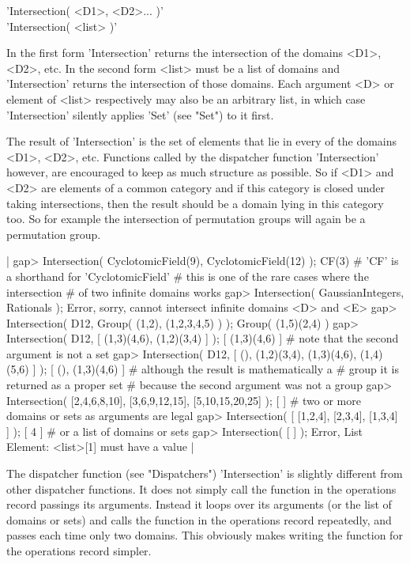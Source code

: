 %

'Intersection( <D1>, <D2>... )' \\
'Intersection( <list> )'

In the first form 'Intersection' returns the  intersection of the domains
<D1>, <D2>, etc.  In the second form <list> must be a list of domains and
'Intersection' returns the intersection  of those domains.  Each argument
<D> or  element of <list> respectively may  also be an arbitrary list, in
which case 'Intersection' silently applies 'Set' (see "Set") to it first.

The result of 'Intersection' is the set of elements  that lie in every of
the domains <D1>, <D2>, etc.  Functions called by the dispatcher function
'Intersection'  however,  are  encouraged to  keep  as  much structure as
possible.  So if <D1> and  <D2> are elements  of a common category and if
this   category is  closed  under taking  intersections,  then the result
should be a   domain lying  in  this category  too.  So  for  example the
intersection of permutation groups will again be a permutation group.

|    gap> Intersection( CyclotomicField(9), CyclotomicField(12) );
    CF(3)    # 'CF' is a shorthand for 'CyclotomicField'
             # this is one of the rare cases where the intersection
             # of two infinite domains works
    gap> Intersection( GaussianIntegers, Rationals );
    Error, sorry, cannot intersect infinite domains <D> and <E>
    gap> Intersection( D12, Group( (1,2), (1,2,3,4,5) ) );
    Group( (1,5)(2,4) )
    gap> Intersection( D12, [ (1,3)(4,6), (1,2)(3,4) ] );
    [ (1,3)(4,6) ]    # note that the second argument is not a set
    gap> Intersection( D12, [ (), (1,2)(3,4), (1,3)(4,6), (1,4)(5,6) ] );
    [ (), (1,3)(4,6) ]    # although the result is mathematically a
                          # group it is returned as a proper set
                          # because the second argument was not a group
    gap> Intersection( [2,4,6,8,10], [3,6,9,12,15], [5,10,15,20,25] );
    [  ]    # two or more domains or sets as arguments are legal
    gap> Intersection( [ [1,2,4], [2,3,4], [1,3,4] ] );
    [ 4 ]    # or a list of domains or sets
    gap> Intersection( [ ] );
    Error, List Element: <list>[1] must have a value |

The  dispatcher function  (see "Dispatchers") 'Intersection' is  slightly
different from other  dispatcher functions.  It does  not simply call the
function in the  operations  record passings  its arguments.   Instead it
loops over its arguments  (or the  list of domains or sets) and calls the
function in  the operations record repeatedly,  and passes each time only
two  domains.   This  obviously  makes  writing  the  function   for  the
operations record simpler.

